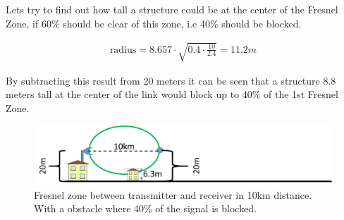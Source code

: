 Lets try to find out how tall a structure could be at the center of the Fresnel Zone, if 60\% should be clear of this zone, i.e 40\% should be blocked.

\begin{align*}
\text{radius} = 8.657\cdot \sqrt{0.4\cdot \frac{10}{2.4}} = 11.2m
\end{align*}
  
By subtracting this result from 20 meters it can be seen that a structure 8.8 meters tall at the center of the link would block up to 40\% of the 1st Fresnel Zone. 

\begin{figure}[H]
	\centering
	\includegraphics[scale=0.50]{figures/fresnel_10km_60procent.png}
	\caption{Fresnel zone between transmitter and receiver in 10km distance. With a obstacle where 40\% of the signal is blocked.}
	\label{fig:fresnel_zones_10km_60procent}
\end{figure}  

